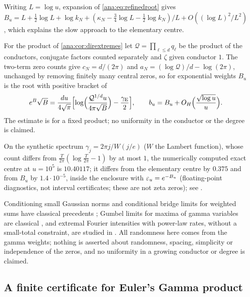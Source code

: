 Writing $L=\log u$, expansion of \eqref{ana:eq:refinedroot} gives
$B_u=L+\frac12\log L+\log k_N+(\kappa_N-\frac34\log L-\frac12\log k_N)/L+O((\log L)^2/L^2)$, which explains
the slow approach to the elementary centre.

\begin{remark}\label{ana:rem:conductorcentre}
For the product of \cref{ana:cor:dirextremes} let $\mathcal Q=\prod_{\ell\le d}q_\ell$ be the product of
the conductors, conjugate factors counted separately and $\zeta$ given conductor $1$. The two-term zero
counts give $c_N=d/(2\pi)$ and $a_N=(\log\mathcal Q)/d-\log(2\pi)$, unchanged by removing finitely many
central zeros, so for exponential weights $B_u$ is the root with positive bracket of
\[
 e^B\sqrt B=\frac{du}{4\sqrt\pi}\Bigl[\log\Bigl(\frac{\mathcal Q^{1/d}u}{4\pi\sqrt B}\Bigr)-\frac{\gamma_{\mathrm E}}2\Bigr],\qquad
 b_u=B_u+O_H\Bigl(\frac{\sqrt{\log u}}u\Bigr).
\]
The estimate is for a fixed product; no uniformity in the conductor or the degree is claimed.
\end{remark}

On the synthetic spectrum $\gamma_j=2\pi j/W(j/e)$ ($W$ the Lambert function), whose count differs from
$\frac T{2\pi}(\log\frac T{2\pi}-1)$ by at most $1$, the numerically computed exact centre at $u=10^5$ is
$10.40117$; it differs from the elementary centre by $0.375$ and from $B_u$ by $1.4\cdot10^{-5}$, inside
the enclosure with $\varepsilon_u=e^{-B_u}$ (floating-point diagnostics, not interval certificates; these are not
zeta zeros); see .

Conditioning small Gaussian norms and conditional bridge limits for weighted sums have classical
precedents \cite{VanCampenhoutCover1981Maximum,MayerWolfZeitouni1993Probability,SobolevShklyaev2020Large};
Gumbel limits for maxima of gamma variables are classical \cite{BoseDasguptaMaulik2008Maxima}, and
extremal Fourier intensities with power-law rates, without a small-total constraint, are studied in
\cite{GyorgyiHoldsworthPortelliRacz2003Statistics}.
All randomness here comes from the gamma weights; nothing is asserted about randomness, spacing,
simplicity or independence of the zeros, and no uniformity in a growing conductor or degree is
claimed.

\subsection{A finite certificate for Euler's Gamma product}\label{ana:sec:eulergamma}
{\raggedright{}}

